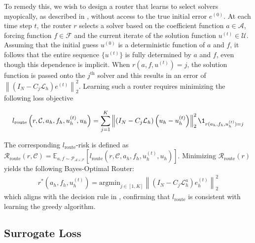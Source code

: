 \documentclass{article} %
\begin{document}
To remedy this, we wish to design a router that learns to select solvers myopically, as described in , without access to the true initial error $e^{(0)}$. At each time step $t$, the router $r$ selects a solver based on the coefficient function $a \in \mathcal{A}$, forcing function $f \in \mathcal{F}$ and the current iterate of the solution function $u^{(t)} \in \mathcal{U}$. Assuming that the initial guess $u^{(0)}$ is a deterministic function of $a$ and $f$, it follows that the entire sequence $\{u^{(t)}\}$ is fully determined by $a$ and $f$, even though this dependence is implicit.
When $r(a, f, u^{(t)}) = j$, the solution function is passed onto the $j^{\text{th}}$ solver and this results in an error of $\left\|\left( I_N - C_{j} \mathcal{L}_{h}\right)e^{(t)}\right\|^2_2$. Learning such a router requires minimizing the following loss objective

\begin{equation} \label{eq:routerloss}
    l_{\text{route}}\left(r,\mathcal{C}, a_h, f_h, u^{(t)}_h, u_h\right) = \sum_{j = 1}^K \left\|\left( I_N - C_{j} \mathcal{L}_{h}\right)\left(u_h - u^{(t)}_h\right)\right\|^2_2\1_{r(a_h, f_h, u^{(t)}_h) = j}
\end{equation}

The corresponding $l_{\text{route}}$-risk is defined as $\mathcal{R}_{\text{route}}\left(r,\mathcal{C}\right) = \mathbb{E}_{a, f \sim \mathcal{P}_{\mathcal{A} \times \mathcal{F}}}\left[l_{\text{route}}\left(r,\mathcal{C}, a_h, f_h, u^{(t)}_h, u_h\right)\right]$. Minimizing $\mathcal{R}_{\text{route}}\left(r\right)$ yields the following Bayes-Optimal Router:
\begin{align*}
    r^*(a_h, f_h, u^{(t)}_h) = \text{argmin}_{j \in [1, K]} \left\|\left( I_N - C_{j} \mathcal{L}_{h}^a\right)e^{(t)}_h\right\|^2_2
\end{align*}
which aligns with the decision rule in , confirming that $l_{\text{route}}$ is consistent with learning the greedy algorithm.

\subsection{Surrogate Loss}
\end{document}
